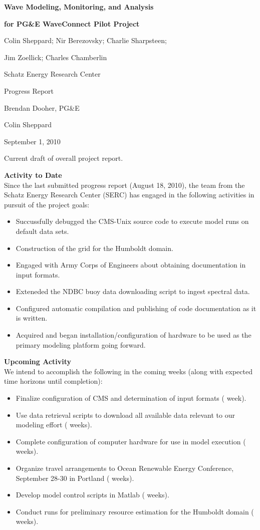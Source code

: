 \documentclass[11pt,letterpaper,oneside,reqno]{article}
\begin{document}
\centerline{\Large \bf Wave Modeling, Monitoring, and Analysis} 
\centerline{\Large \bf for PG\&E WaveConnect Pilot Project}
\centerline{Colin Sheppard; Nir Berezovsky; Charlie Sharpsteen;}
\centerline{Jim Zoellick; Charles Chamberlin}
\centerline{Schatz Energy Research Center}
\bigskip
\bigskip

 Progress Report

 Brendan Dooher, PG\&E

 Colin Sheppard

 September 1, 2010 

 Current draft of overall project report.

\textbf{Activity to Date}\\
Since the last submitted progress report (August 18, 2010), the team from the Schatz Energy Research Center (SERC) has engaged in the following activities in pursuit of the project goals:
\begin{itemize}
\item Succussfully debugged the CMS-Unix source code to execute model runs on default data sets.
\item Construction of the grid for the Humboldt domain. 
\item Engaged with Army Corps of Engineers about obtaining documentation in input formats.
\item Exteneded the NDBC buoy data downloading script to ingest spectral data.
\item Configured automatic compilation and publishing of code documentation as it is written.
\item Acquired and began installation/configuration of hardware to be used as the primary modeling platform going forward.
\end{itemize}

\textbf{Upcoming Activity}\\
We intend to accomplish the following in the coming weeks (along with expected time horizons until completion):
\begin{itemize}
\item Finalize configuration of CMS and determination of input formats ( week).
\item Use data retrieval scripts to download all available data relevant to our modeling effort ( weeks).
\item Complete configuration of computer hardware for use in model execution ( weeks).
\item Organize travel arrangements to Ocean Renewable Energy Conference, September 28-30 in Portland ( weeks).
\item Develop model control scripts in Matlab ( weeks).
\item Conduct runs for preliminary resource estimation for the Humboldt domain ( weeks).
\end{itemize}
\end{document}
